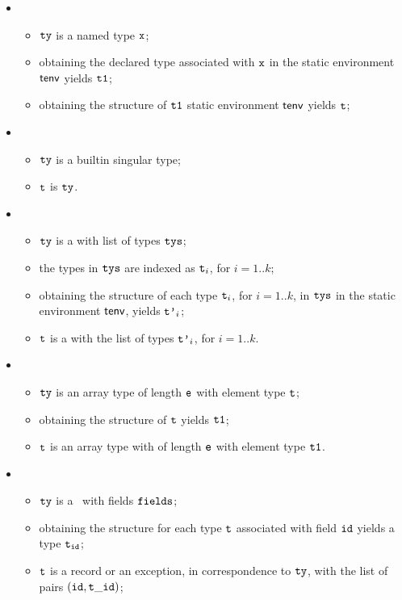 \ProseParagraph
\OneApplies
\begin{itemize}
\item {}
  \begin{itemize}
  \item $\texttt{ty}$ is a named type $\texttt{x}$;
  \item obtaining the declared type associated with $\texttt{x}$ in the static environment $\textsf{tenv}$ yields $\texttt{t1}$\ProseOrTypeError;
  \item obtaining the structure of $\texttt{t1}$ static environment $\textsf{tenv}$ yields $\texttt{t}$\ProseOrTypeError;
  \end{itemize}
\item {}
  \begin{itemize}
  \item $\texttt{ty}$ is a builtin singular type;
  \item $\texttt{t}$ is $\texttt{ty}$.
  \end{itemize}
\item {}
  \begin{itemize}
  \item $\texttt{ty}$ is a \tupletypeterm{} with list of types $\texttt{tys}$;
  \item the types in $\texttt{tys}$ are indexed as $\texttt{t}_i$, for $i=1..k$;
  \item obtaining the structure of each type $\texttt{t}_i$, for $i=1..k$, in $\texttt{tys}$ in the static environment $\textsf{tenv}$,
  yields $\texttt{t'}_i$\ProseOrTypeError;
  \item $\texttt{t}$ is a \tupletypeterm{} with the list of types $\texttt{t'}_i$, for $i=1..k$.
  \end{itemize}
\item {}
  \begin{itemize}
    \item $\texttt{ty}$ is an array type of length $\texttt{e}$ with element type $\texttt{t}$;
    \item obtaining the structure of $\texttt{t}$ yields $\texttt{t1}$\ProseOrTypeError;
    \item $\texttt{t}$ is an array type with of length $\texttt{e}$ with element type $\texttt{t1}$.
  \end{itemize}
\item {}
  \begin{itemize}
  \item $\texttt{ty}$ is a \structuredtype\ with fields $\texttt{fields}$;
  \item obtaining the structure for each type $\texttt{t}$ associated with field $\texttt{id}$ yields a type $\texttt{t}_{\texttt{id}}$\ProseOrTypeError;
  \item $\texttt{t}$ is a record or an exception, in correspondence to $\texttt{ty}$, with the list of pairs $(\texttt{id}, \texttt{t}\_\texttt{id})$;
  \end{itemize}
\end{itemize}

